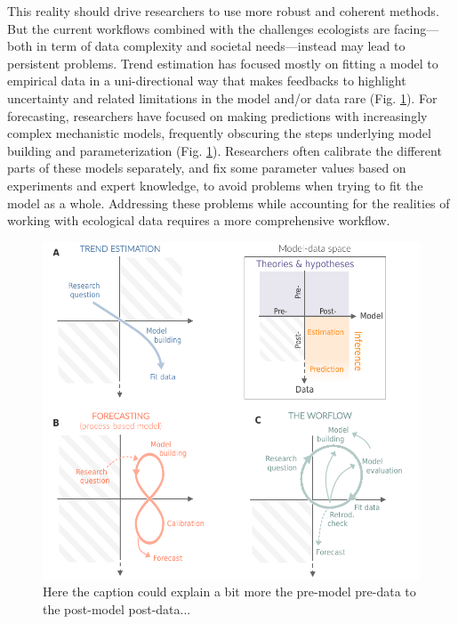 \documentclass[11pt]{article}
\begin{document}
This reality should drive researchers to use more robust and coherent methods. But the current workflows combined with the challenges ecologists are facing---both in term of data complexity and societal needs---instead may lead to persistent problems. %
Trend estimation has focused mostly on fitting a model to empirical data in a uni-directional way %
that makes feedbacks to highlight uncertainty and related limitations in the model and/or data rare (Fig. \ref{fig:modeldata}). For forecasting, researchers have focused on making predictions with increasingly complex mechanistic models, frequently obscuring the steps underlying model building and parameterization (Fig. \ref{fig:modeldata}). Researchers often calibrate the different parts of these models separately, and fix some parameter values based on experiments and expert knowledge, to avoid problems when trying to fit the model as a whole. %
Addressing these problems while accounting for the realities of working with ecological data requires a more comprehensive workflow. 

\begin{figure}[h]
	\centering
	\includegraphics{figures/modeldataspaces_rotation}
	\caption{Here the caption could explain a bit more the pre-model pre-data to the post-model post-data...} 
	\label{fig:modeldata}
\end{figure}
\end{document}
